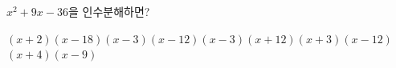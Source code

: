 $x^2+9x-36$을 인수분해하면?
\begin{choicesii}{$(x+2)(x-18)$}{$(x-3)(x-12)$}{$(x-3)(x+12)$}{$(x+3)(x-12)$}{$(x+4)(x-9)$}\end{choicesii}
